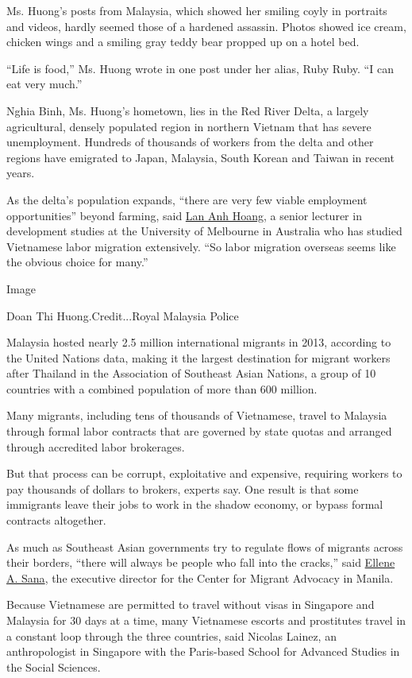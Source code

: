 Ms. Huong's posts from Malaysia, which showed her smiling coyly in
portraits and videos, hardly seemed those of a hardened assassin. Photos
showed ice cream, chicken wings and a smiling gray teddy bear propped up
on a hotel bed.

``Life is food,'' Ms. Huong wrote in one post under her alias, Ruby
Ruby. ``I can eat very much.''

Nghia Binh, Ms. Huong's hometown, lies in the Red River Delta, a largely
agricultural, densely populated region in northern Vietnam that has
severe unemployment. Hundreds of thousands of workers from the delta and
other regions have emigrated to Japan, Malaysia, South Korean and Taiwan
in recent years.

As the delta's population expands, ``there are very few viable
employment opportunities'' beyond farming, said
\href{http://findanexpert.unimelb.edu.au/display/person350058}{Lan Anh
Hoang}, a senior lecturer in development studies at the University of
Melbourne in Australia who has studied Vietnamese labor migration
extensively. ``So labor migration overseas seems like the obvious choice
for many.''

Image

Doan Thi Huong.Credit...Royal Malaysia Police

Malaysia hosted nearly 2.5 million international migrants in 2013,
according to the United Nations data, making it the largest destination
for migrant workers after Thailand in the Association of Southeast Asian
Nations, a group of 10 countries with a combined population of more than
600 million.

Many migrants, including tens of thousands of Vietnamese, travel to
Malaysia through formal labor contracts that are governed by state
quotas and arranged through accredited labor brokerages.

But that process can be corrupt, exploitative and expensive, requiring
workers to pay thousands of dollars to brokers, experts say. One result
is that some immigrants leave their jobs to work in the shadow economy,
or bypass formal contracts altogether.

As much as Southeast Asian governments try to regulate flows of migrants
across their borders, ``there will always be people who fall into the
cracks,'' said
\href{http://centerformigrantadvocacy.com/about-us/mission-and-members/ellene-a-sana/}{Ellene
A. Sana}, the executive director for the Center for Migrant Advocacy in
Manila.

Because Vietnamese are permitted to travel without visas in Singapore
and Malaysia for 30 days at a time, many Vietnamese escorts and
prostitutes travel in a constant loop through the three countries, said
Nicolas Lainez, an anthropologist in Singapore with the Paris-based
School for Advanced Studies in the Social Sciences.


